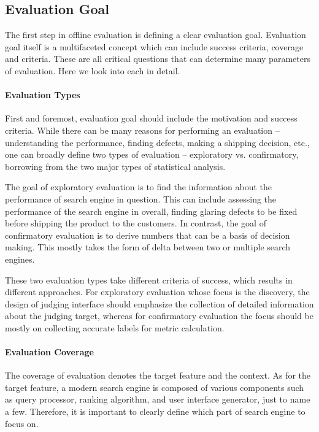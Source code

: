 \subsection{Evaluation Goal}
The first step in offline evaluation is defining a clear evaluation goal. Evaluation goal itself is a multifaceted concept which can include success criteria, coverage and criteria. These are all critical questions that can determine many parameters of evaluation. Here we look into each in detail.

\paragraph{Evaluation Types}
First and foremost, evaluation goal should include the motivation and success criteria. While there can be many reasons for performing an evaluation -- understanding the performance, finding defects, making a shipping decision, etc., one can broadly define two types of evaluation -- exploratory vs. confirmatory, borrowing from the two major types of statistical analysis. %

The goal of exploratory evaluation is to find the information about the performance of search engine in question. This can include assessing the performance of the search engine in overall, finding glaring defects to be fixed before shipping the product to the customers. In contrast, the goal of confirmatory evaluation is to derive numbers that can be a basis of decision making. This mostly takes the form of delta between two or multiple search engines. 

These two evaluation types take different criteria of success, which results in different approaches. For exploratory evaluation whose focus is the discovery, the design of judging interface should emphasize the collection of detailed information about the judging target, whereas for confirmatory evaluation the focus should be mostly on collecting accurate labels for metric calculation. 

\paragraph{Evaluation Coverage}
The coverage of evaluation denotes the target feature and the context. As for the target feature, a modern search engine is composed of various components such as query processor, ranking algorithm, and user interface generator, just to name a few. Therefore, it is important to clearly define which part of search engine to focus on.

